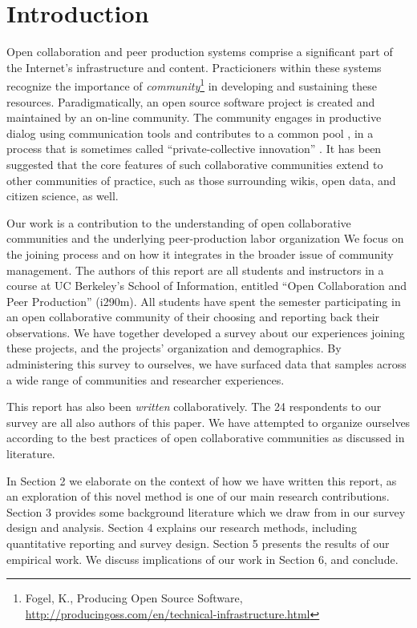 \section{Introduction}

Open collaboration and peer production systems comprise a significant
part of the Internet's infrastructure and content.
Practicioners within these systems recognize the importance of
\emph{community}\footnote{Fogel, K., Producing Open Source Software, \url{http://producingoss.com/en/technical-infrastructure.html}} in developing and sustaining these resources.
Paradigmatically, an open source software project is created and maintained by an on-line community.
The community engages in productive dialog using communication tools and contributes to
a common pool \cite{ostrom1990}, in a process that is sometimes called ``private-collective innovation'' \cite{vonhippel2003oss}.
It has been suggested that the core features of such collaborative
communities extend to other communities of practice, such as those
surrounding wikis, open data, and citizen science, as well.

Our work is a contribution to the understanding of  open collaborative
communities and the underlying peer-production labor organization \cite{benkler2002}
We focus on the joining process and on how
it integrates in the broader issue of community management.
The authors of this report are all students and instructors in a
course at UC Berkeley's School of Information, entitled ``Open Collaboration and Peer Production'' (i290m).
All students have spent the semester participating in an open
collaborative community of their choosing and reporting back
their observations.
We have together developed a survey about our experiences joining
these projects, and the projects' organization and demographics.
By administering this survey to ourselves, we have surfaced data
that samples across a wide range of communities and researcher experiences.



This report has also been \emph{written} collaboratively.
The 24 respondents to our survey are all also authors of this paper.
We have attempted to organize ourselves according
to the best practices of open collaborative communities as discussed in literature.


In Section 2 we elaborate on the context of how we have written this report, as an exploration of this novel method is one of our main research contributions.
Section 3 provides some background literature which we draw from in
our survey design and analysis.
Section 4 explains our research methods, including quantitative
reporting and survey design.
Section 5 presents the results of our empirical work.
We discuss implications of our work in Section 6, and conclude. 


